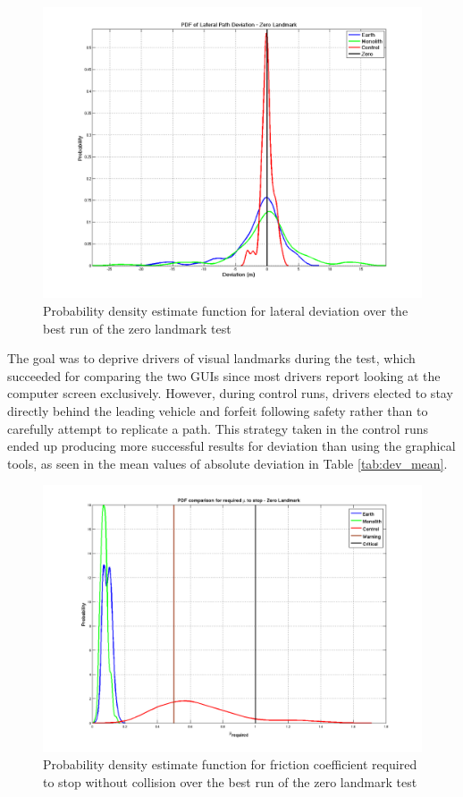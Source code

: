 \documentclass[twocolumn,10pt]{article}
\begin{document}
    \begin{figure}[ht] \centering
      \includegraphics[width=\columnwidth]{../graphics/pdf_zero_landmark_deviation.png}
      \caption{Probability density estimate function for lateral deviation over the best run of the zero landmark test}
      \label{fig:pdf_zl_dev}
    \end{figure}

    The goal was to deprive drivers of visual landmarks during the test, which succeeded for comparing the two GUIs since most drivers report looking at the computer screen exclusively. However, during control runs, drivers elected to stay directly behind the leading vehicle and forfeit following safety rather than to carefully attempt to replicate a path. This strategy taken in the control runs ended up producing more successful results for deviation than using the graphical tools, as seen in the mean values of absolute deviation in Table \ref{tab:dev_mean}. 

    \begin{figure}[ht] \centering
      \includegraphics[width=\columnwidth]{../graphics/zero_landmark_mu_distribution.png}
      \caption{Probability density estimate function for friction coefficient required to stop without collision over the best run of the zero landmark test}
      \label{fig:pdf_zl_mu}
    \end{figure}
\end{document}

